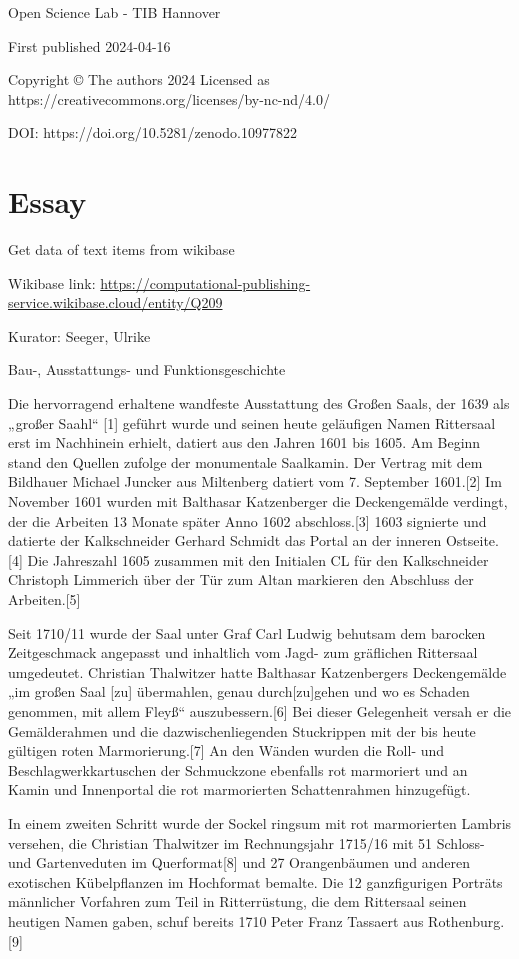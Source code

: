 \documentclass[
  letterpaper,
]{book}
\begin{document}
Open Science Lab - TIB Hannover

First published 2024-04-16

Copyright © The authors 2024 Licensed as
https://creativecommons.org/licenses/by-nc-nd/4.0/

DOI: https://doi.org/10.5281/zenodo.10977822


\chapter{Essay}\label{essay}

Get data of text items from wikibase

Wikibase link:
\url{https://computational-publishing-service.wikibase.cloud/entity/Q209}

Kurator: Seeger, Ulrike

Bau-, Ausstattungs- und Funktionsgeschichte

Die hervorragend erhaltene wandfeste Ausstattung des Großen Saals, der
1639 als „großer Saahl`` {[}1{]} geführt wurde und seinen heute
geläufigen Namen Rittersaal erst im Nachhinein erhielt, datiert aus den
Jahren 1601 bis 1605. Am Beginn stand den Quellen zufolge der
monumentale Saalkamin. Der Vertrag mit dem Bildhauer Michael Juncker aus
Miltenberg datiert vom 7. September 1601.{[}2{]} Im November 1601 wurden
mit Balthasar Katzenberger die Deckengemälde verdingt, der die Arbeiten
13 Monate später Anno 1602 abschloss.{[}3{]} 1603 signierte und datierte
der Kalkschneider Gerhard Schmidt das Portal an der inneren
Ostseite.{[}4{]} Die Jahreszahl 1605 zusammen mit den Initialen CL für
den Kalkschneider Christoph Limmerich über der Tür zum Altan markieren
den Abschluss der Arbeiten.{[}5{]}

Seit 1710/11 wurde der Saal unter Graf Carl Ludwig behutsam dem barocken
Zeitgeschmack angepasst und inhaltlich vom Jagd- zum gräflichen
Rittersaal umgedeutet. Christian Thalwitzer hatte Balthasar
Katzenbergers Deckengemälde „im großen Saal {[}zu{]} übermahlen, genau
durch{[}zu{]}gehen und wo es Schaden genommen, mit allem Fleyß``
auszubessern.{[}6{]} Bei dieser Gelegenheit versah er die Gemälderahmen
und die dazwischenliegenden Stuckrippen mit der bis heute gültigen roten
Marmorierung.{[}7{]} An den Wänden wurden die Roll- und
Beschlagwerkkartuschen der Schmuckzone ebenfalls rot marmoriert und an
Kamin und Innenportal die rot marmorierten Schattenrahmen hinzugefügt.

In einem zweiten Schritt wurde der Sockel ringsum mit rot marmorierten
Lambris versehen, die Christian Thalwitzer im Rechnungsjahr 1715/16 mit
51 Schloss- und Gartenveduten im Querformat{[}8{]} und 27 Orangenbäumen
und anderen exotischen Kübelpflanzen im Hochformat bemalte. Die 12
ganzfigurigen Porträts männlicher Vorfahren zum Teil in Ritterrüstung,
die dem Rittersaal seinen heutigen Namen gaben, schuf bereits 1710 Peter
Franz Tassaert aus Rothenburg.{[}9{]}
\end{document}
